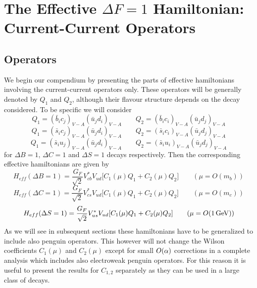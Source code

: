 \section{The Effective $\Delta F=1$ Hamiltonian: Current-Current Operators}
   \label{sec:HeffdF1:22}

\subsection{Operators}
   \label{sec:HeffdF1:22:op}
We begin our compendium by presenting the parts of effective
hamiltonians involving the current-current operators only.
These operators will be generally denoted by $Q_1$ and $Q_2$,
although their flavour structure depends on the decay considered.
To be specific we will consider
\begin{equation}\label{B1}
Q_1=(\bar b_i c_j)_{V-A} (\bar u_j d_i)_{V-A}
\qquad 
Q_2=(\bar b_i c_i)_{V-A} (\bar u_j d_j)_{V-A}
\end{equation}
\begin{equation}\label{B2}
Q_1=(\bar s_i c_j)_{V-A} (\bar u_j d_i)_{V-A}
\qquad 
Q_2=(\bar s_i c_i)_{V-A} (\bar u_j d_j)_{V-A}
\end{equation}
\begin{equation}\label{B3}
Q_1=(\bar s_i u_j)_{V-A} (\bar u_j d_i)_{V-A}
\qquad 
Q_2=(\bar s_i u_i)_{V-A} (\bar u_j d_j)_{V-A}
\end{equation}
for $\Delta B=1$, $\Delta C=1$ and $\Delta S=1$ decays respectively.
Then the corresponding effective hamiltonians are given by
\begin{equation}\label{B4}
H_{eff}(\Delta B=1)=\frac{G_F}{\sqrt{2}}V_{cb}^{*}V_{ud}
\lbrack C_1(\mu) Q_1+C_2(\mu)Q_2 \rbrack
\qquad
(\mu=O(m_b))
\end{equation}
\begin{equation}\label{B5}
H_{eff}(\Delta C=1)=\frac{G_F}{\sqrt{2}}V_{cs}^{*}V_{ud}
\lbrack C_1(\mu) Q_1+C_2(\mu)Q_2 \rbrack
\qquad
(\mu=O(m_c))
\end{equation}
\begin{equation}\label{B6}
H_{eff}(\Delta S=1)=\frac{G_F}{\sqrt{2}}V_{us}^{*}V_{ud}
\lbrack C_1(\mu) Q_1+C_2(\mu)Q_2 \rbrack
\qquad
(\mu=O(1\, {\rm GeV}))
\end{equation}
As we will see in subsequent sections these hamiltonians have to be
generalized to include also penguin operators. This however will not
change the Wilson coefficients $C_1(\mu)$ and $C_2(\mu)$ except for
small $O(\alpha)$ corrections in a complete analysis which includes
also electroweak penguin operators. For this reason it is useful to
present the results for $C_{1,2}$ separately as they can be used in a
large class of decays.

